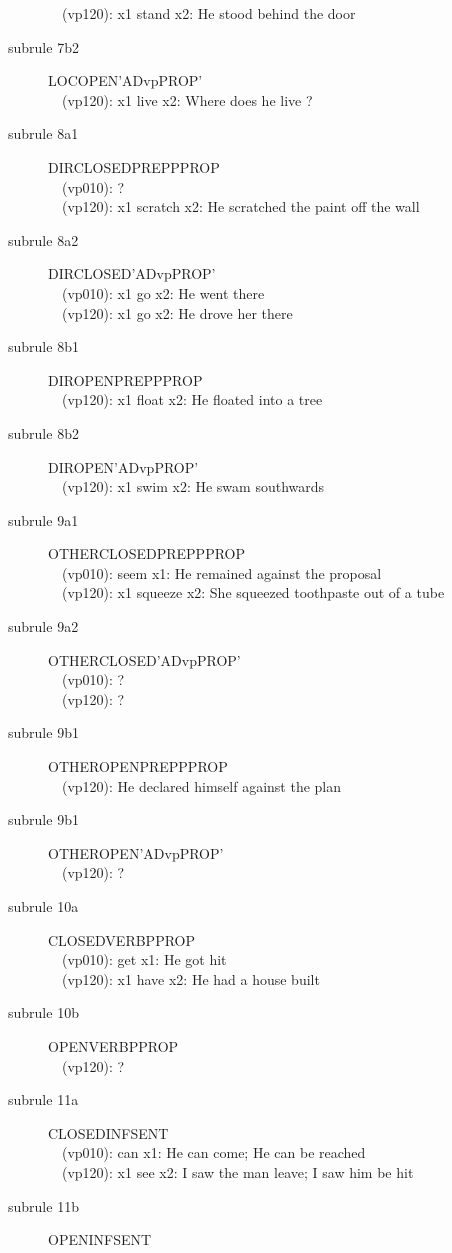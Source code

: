 \begin{description}
\begin{description}
\ \ (vp120): x1 stand x2: He stood behind the door\\
\item [subrule 7b2] LOCOPEN'ADvpPROP' \\
\ \ (vp120): x1 live x2: Where does he live ?
\item [subrule 8a1] DIRCLOSEDPREPPPROP\\
\ \ (vp010): ?\\
\ \ (vp120): x1 scratch x2: He scratched the paint off the wall
\item [subrule 8a2] DIRCLOSED'ADvpPROP' \\
\ \ (vp010): x1 go x2: He went there\\
\ \ (vp120): x1 go x2: He drove her there\\
\item [subrule 8b1] DIROPENPREPPPROP\\
\ \ (vp120): x1 float x2: He floated into a tree 
\item [subrule 8b2] DIROPEN'ADvpPROP' \\
\ \ (vp120): x1 swim x2: He swam southwards
\item [subrule 9a1] OTHERCLOSEDPREPPPROP\\
\ \ (vp010): seem x1: He remained against the proposal\\
\ \ (vp120): x1 squeeze x2: She squeezed toothpaste out of a tube\\
\item [subrule 9a2] OTHERCLOSED'ADvpPROP'\\
\ \ (vp010): ?\\
\ \ (vp120): ?
\item [subrule 9b1] OTHEROPENPREPPPROP\\
\ \ (vp120): He declared himself against the plan
\item [subrule 9b1] OTHEROPEN'ADvpPROP'\\
\ \ (vp120): ?
\item [subrule 10a] CLOSEDVERBPPROP\\
\ \ (vp010): get x1: He got hit\\
\ \ (vp120): x1 have x2: He had a house built
\item [subrule 10b] OPENVERBPPROP\\
\ \ (vp120): ?
\item [subrule 11a] CLOSEDINFSENT\\
\ \ (vp010): can x1: He can come; He can be reached\\
\ \ (vp120): x1 see x2: I saw the man leave; I saw him be hit
\item [subrule 11b] OPENINFSENT\\

\end{description}
\end{description}
